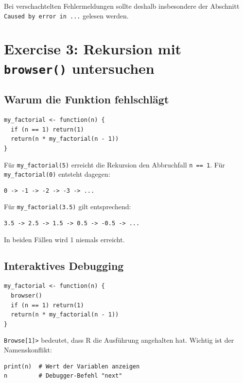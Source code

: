 \documentclass[11pt,a4paper]{ctexart}
\begin{document}
Bei verschachtelten Fehlermeldungen sollte deshalb insbesondere der Abschnitt
\texttt{Caused by error in ...} gelesen werden.

\section{Exercise 3: Rekursion mit \texttt{browser()} untersuchen}

\subsection{Warum die Funktion fehlschlägt}

\begin{lstlisting}[style=rcode]
my_factorial <- function(n) {
  if (n == 1) return(1)
  return(n * my_factorial(n - 1))
}
\end{lstlisting}

Für \lstinline|my_factorial(5)| erreicht die Rekursion den Abbruchfall
\lstinline|n == 1|. Für \lstinline|my_factorial(0)| entsteht dagegen:

\begin{lstlisting}[style=textcode]
0 -> -1 -> -2 -> -3 -> ...
\end{lstlisting}

Für \lstinline|my_factorial(3.5)| gilt entsprechend:

\begin{lstlisting}[style=textcode]
3.5 -> 2.5 -> 1.5 -> 0.5 -> -0.5 -> ...
\end{lstlisting}

In beiden Fällen wird 1 niemals erreicht.

\subsection{Interaktives Debugging}

\begin{lstlisting}[style=rcode]
my_factorial <- function(n) {
  browser()
  if (n == 1) return(1)
  return(n * my_factorial(n - 1))
}
\end{lstlisting}

\texttt{Browse[1]>} bedeutet, dass R die Ausführung angehalten hat. Wichtig ist
der Namenskonflikt:

\begin{lstlisting}[style=rcode]
print(n)  # Wert der Variablen anzeigen
n         # Debugger-Befehl "next"
\end{lstlisting}
\end{document}
